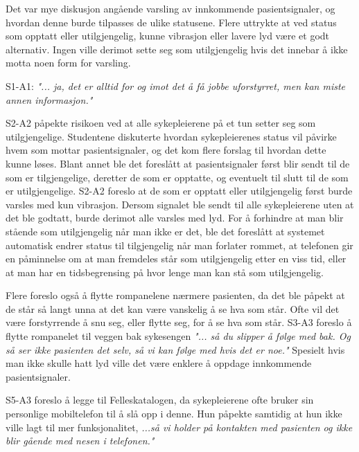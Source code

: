 \noindent
Det var mye diskusjon angående varsling av innkommende pasientsignaler, og hvordan denne burde tilpasses de ulike statusene. Flere uttrykte at ved status som opptatt eller utilgjengelig, kunne vibrasjon eller lavere lyd være et godt alternativ. Ingen ville derimot sette seg som utilgjengelig hvis det innebar å ikke motta noen form for varsling.

S1-A1: \emph{"... ja, det er alltid for og imot det å få jobbe uforstyrret, men kan miste annen informasjon."}

\noindent
S2-A2 påpekte risikoen ved at alle sykepleierene på et tun setter seg som utilgjengelige.  
Studentene diskuterte hvordan sykepleierenes status vil påvirke hvem som mottar pasientsignaler, og det kom flere forslag til hvordan dette kunne løses. Blant annet ble det foreslått at pasientsignaler først blir sendt til de som er tilgjengelige, deretter de som er opptatte, og eventuelt til slutt til de som er utilgjengelige. S2-A2 foreslo at de som er opptatt eller utilgjengelig først burde varsles med kun vibrasjon. Dersom signalet ble sendt til alle sykepleierene uten at det ble godtatt, burde derimot alle varsles med lyd.  
For å forhindre at man blir stående som utilgjengelig når man ikke er det, ble det foreslått at systemet automatisk endrer status til tilgjengelig når man forlater rommet, at telefonen gir en påminnelse om at man fremdeles står som utilgjengelig etter en viss tid, eller at man har en tidsbegrensing på hvor lenge man kan stå som utilgjengelig. 

\noindent
Flere foreslo også å flytte rompanelene nærmere pasienten, da det ble påpekt at de står så langt unna at det kan være vanskelig å se hva som står. Ofte vil det være forstyrrende å snu seg, eller flytte seg, for å se hva som står. S3-A3 foreslo å flytte rompanelet til veggen bak sykesengen \emph{"... så du slipper å følge med bak. Og så ser ikke pasienten det selv, så vi kan følge med hvis det er noe."} Spesielt hvis man ikke skulle hatt lyd ville det være enklere å oppdage innkommende pasientsignaler.

\noindent
S5-A3 foreslo å legge til Felleskatalogen, da sykepleierene ofte bruker sin personlige mobiltelefon til å slå opp i denne. Hun påpekte samtidig at hun ikke ville lagt til mer funksjonalitet, \emph{...så vi holder på kontakten med pasienten og ikke blir gående med nesen i telefonen."}

